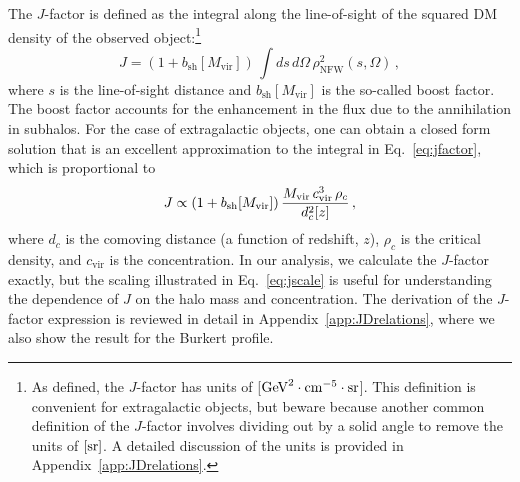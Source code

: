 The $J$-factor is defined as the integral along the line-of-sight of the squared DM density of the observed object:\footnote{As defined, the $J$-factor has units of [${\rm GeV}^2 \cdot {\rm cm}^{-5} \cdot {\rm sr}$]. This definition is convenient for extragalactic objects, but beware because another common definition of the $J$-factor involves dividing out by a solid angle to remove the units of $[{\rm sr}]$. A detailed discussion of the units is provided in Appendix~\ref{app:JDrelations}.}
\begin{equation}
J = \left(1+b_\text{sh}[M_\text{vir}]\right)\,  \int ds \, d\Omega\,\rho^{2}_\text{NFW}(s,\Omega)\,,
\label{eq:jfactor}
\end{equation}
where $s$ is the line-of-sight distance and $b_\text{sh}[M_\text{vir}]$ is the so-called boost factor.  The boost factor accounts for the enhancement in the flux due to the annihilation in subhalos.   For the case of extragalactic objects, one can obtain a closed form solution that is an excellent approximation to the integral in Eq.~\ref{eq:jfactor}, which is proportional to
\begin{equation}
J \propto \left(1+b_\text{sh}[M_\text{vir}]\right) \frac{M_{\rm vir} \, c_{\rm vir}^3\, \rho_c}{d_c^2[z]}\,,
\label{eq:jscale}
\end{equation}
where $d_c$ is the comoving distance (a function of redshift, $z$), $\rho_c$ is the critical density, and $c_\text{vir}$ is the concentration.  In our analysis, we calculate the $J$-factor exactly, but the scaling illustrated in Eq.~\ref{eq:jscale} is useful for understanding the dependence of $J$ on the halo mass and concentration. The derivation of the $J$-factor expression is reviewed in detail in Appendix~\ref{app:JDrelations}, where we also show the result for the Burkert profile.

